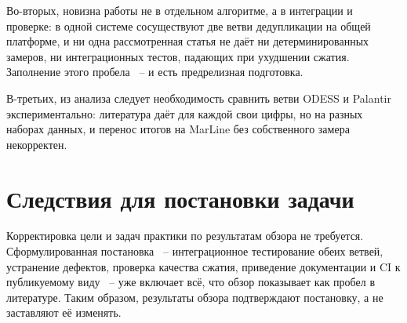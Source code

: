 \documentclass[a4paper]{article}
\begin{document}
Во-вторых, новизна работы не в отдельном алгоритме, а в интеграции и
проверке: в одной системе сосуществуют две ветви дедупликации на общей
платформе, и ни одна рассмотренная статья не даёт ни детерминированных
замеров, ни интеграционных тестов, падающих при ухудшении сжатия. Заполнение
этого пробела ~-- и есть предрелизная подготовка.

В-третьих, из анализа следует необходимость сравнить ветви ODESS и Palantir
экспериментально: литература даёт для каждой свои цифры, но на разных наборах
данных, и перенос итогов на MarLine без собственного замера некорректен.

\section{Следствия для постановки задачи}

Корректировка цели и задач практики по результатам обзора не требуется.
Сформулированная постановка ~-- интеграционное тестирование обеих ветвей,
устранение дефектов, проверка качества сжатия, приведение документации и CI
к публикуемому виду ~-- уже включает всё, что обзор показывает как пробел
в литературе. Таким образом, результаты обзора подтверждают постановку,
а не заставляют её изменять.
\end{document}
